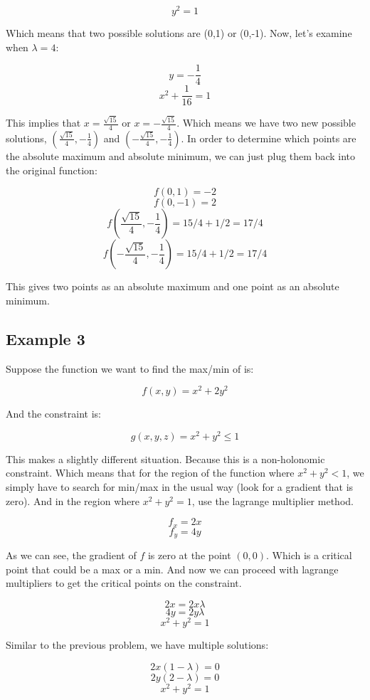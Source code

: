 \documentclass{article}
\begin{document}
$$y^2 = 1$$

Which means that two possible solutions are (0,1) or (0,-1).  Now, let's examine when $\lambda=4$:

$$y = -\frac{ 1 }{ 4 }$$
$$x^2 + \frac{ 1 }{ 16 } = 1$$

This implies that $x=\frac{ \sqrt{ 15 } }{ 4 }$ or $x = -\frac{ \sqrt{ 15 } }{ 4 }$.  Which means we have two new possible solutions, $( \frac{ \sqrt{ 15 } }{ 4 }, -\frac{ 1 }{ 4 } )$ and $( -\frac{ \sqrt{ 15 } }{ 4 }, -\frac{ 1 }{ 4 } )$.  In order to determine which points are the absolute maximum and absolute minimum, we can just plug them back into the original function:

$$f( 0, 1 ) = -2$$
$$f( 0, -1 ) = 2$$
$$f( \frac{ \sqrt{ 15 } }{ 4 }, -\frac{ 1 }{ 4 } ) = 15/4 + 1/2 = 17/4$$
$$f( -\frac{ \sqrt{ 15 } }{ 4 }, -\frac{ 1 }{ 4 } ) = 15/4 + 1/2 = 17/4$$

This gives two points as an absolute maximum and one point as an absolute minimum.

%
%	
%
\subsection{Example 3}

Suppose the function we want to find the max/min of is:

$$f( x, y ) = x^2 + 2y^2$$

And the constraint is:

$$g( x, y, z ) = x^2 + y^2 \leq 1$$

This makes a slightly different situation.  Because this is a non-holonomic constraint.  Which means that for the region of the function where $x^2 + y^2 < 1$, we simply have to search for min/max in the usual way (look for a gradient that is zero).  And in the region where $x^2 + y^2 = 1$, use the lagrange multiplier method.

$$f_x = 2x$$
$$f_y = 4y$$

As we can see, the gradient of $f$ is zero at the point $( 0, 0 )$.  Which is a critical point that could be a max or a min.  And now we can proceed with lagrange multipliers to get the critical points on the constraint.

$$2x = 2x\lambda$$
$$4y = 2y\lambda$$
$$x^2 + y^2 = 1$$

Similar to the previous problem, we have multiple solutions:

$$2x( 1 - \lambda ) = 0$$
$$2y( 2 - \lambda ) = 0$$
$$x^2 + y^2 = 1$$
\end{document}
